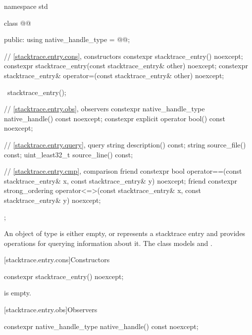 \begin{codeblock}
namespace std {
  class @@ {
  public:
    using native_handle_type = @@;

    // \ref{stacktrace.entry.cons}, constructors
    constexpr stacktrace_entry() noexcept;
    constexpr stacktrace_entry(const stacktrace_entry& other) noexcept;
    constexpr stacktrace_entry& operator=(const stacktrace_entry& other) noexcept;

    ~stacktrace_entry();

    // \ref{stacktrace.entry.obs}, observers
    constexpr native_handle_type native_handle() const noexcept;
    constexpr explicit operator bool() const noexcept;

    // \ref{stacktrace.entry.query}, query
    string description() const;
    string source_file() const;
    uint_least32_t source_line() const;

    // \ref{stacktrace.entry.cmp}, comparison
    friend constexpr bool operator==(const stacktrace_entry& x,
                                     const stacktrace_entry& y) noexcept;
    friend constexpr strong_ordering operator<=>(const stacktrace_entry& x,
                                                 const stacktrace_entry& y) noexcept;
  };
}
\end{codeblock}

\pnum
An object of type  is either empty,
or represents a stacktrace entry and
provides operations for querying information about it.
The class  models
 and
.

[stacktrace.entry.cons]{Constructors}

%
\begin{itemdecl}
constexpr stacktrace_entry() noexcept;
\end{itemdecl}

\begin{itemdescr}
\pnum
\ensures
{} is empty.
\end{itemdescr}

[stacktrace.entry.obs]{Observers}

%
\begin{itemdecl}
constexpr native_handle_type native_handle() const noexcept;
\end{itemdecl}

